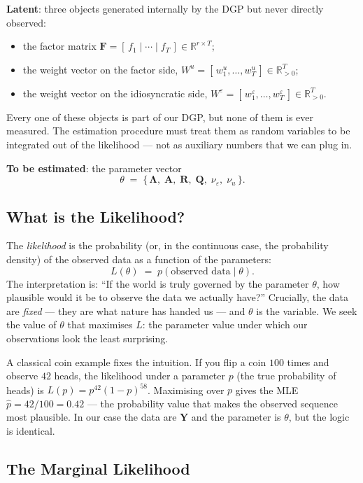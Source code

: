 \documentclass[11pt, a4paper, oneside]{article}
\newcommand{\mY}{\mathbf{Y}}
\newcommand{\mF}{\mathbf{F}}
\newcommand{\mL}{\boldsymbol{\Lambda}}
\newcommand{\mA}{\mathbf{A}}
\newcommand{\mR}{\mathbf{R}}
\newcommand{\mQ}{\mathbf{Q}}
\begin{document}
\textbf{Latent}: three objects generated internally by the DGP but never
directly observed:
\begin{itemize}[leftmargin=1.5em, itemsep=2pt]
    \item the factor matrix
          $\mF = [\,f_1 \mid \cdots \mid f_T\,] \in \mathbb{R}^{r \times T}$;
    \item the weight vector on the factor side,
          $W^u = [\,w^u_1, \ldots, w^u_T\,] \in \mathbb{R}^{T}_{>0}$;
    \item the weight vector on the idiosyncratic side,
          $W^\varepsilon = [\,w^\varepsilon_1, \ldots, w^\varepsilon_T\,] \in \mathbb{R}^{T}_{>0}$.
\end{itemize}
Every one of these objects is part of our DGP, but none of them is ever
measured. The estimation procedure must treat them as random variables to
be integrated out of the likelihood — not as auxiliary numbers that we
can plug in.

\textbf{To be estimated}: the parameter vector
\[
\theta \;=\; \big\{\,\mL,\;\mA,\;\mR,\;\mQ,\;\nu_\varepsilon,\;\nu_u\,\big\}.
\]

\subsection{What is the Likelihood?}

The \emph{likelihood} is the probability (or, in the continuous case, the
probability density) of the observed data as a function of the parameters:
\[
L(\theta) \;=\; p(\text{observed data} \mid \theta).
\]
The interpretation is: ``If the world is truly governed by the parameter
$\theta$, how plausible would it be to observe the data we actually have?''
Crucially, the data are \emph{fixed} — they are what nature has handed us
— and $\theta$ is the variable. We seek the value of $\theta$ that
maximises $L$: the parameter value under which our observations look the
least surprising.

A classical coin example fixes the intuition. If you flip a coin $100$
times and observe $42$ heads, the likelihood under a parameter $p$ (the
true probability of heads) is $L(p) = p^{42}(1-p)^{58}$. Maximising over
$p$ gives the MLE $\hat{p} = 42/100 = 0.42$ — the probability value that
makes the observed sequence most plausible. In our case the data are
$\mY$ and the parameter is $\theta$, but the logic is identical.

\subsection{The Marginal Likelihood}
\end{document}
